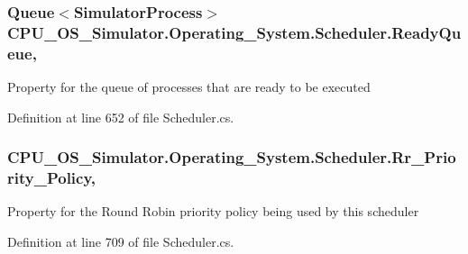 \subsubsection[{Ready\+Queue}]{\setlength{\rightskip}{0pt plus 5cm}Queue$<${\bf Simulator\+Process}$>$ C\+P\+U\+\_\+\+O\+S\+\_\+\+Simulator.\+Operating\+\_\+\+System.\+Scheduler.\+Ready\+Queue\hspace{0.3cm}{\ttfamily [get]}, {\ttfamily [set]}}\label{class_c_p_u___o_s___simulator_1_1_operating___system_1_1_scheduler_a7f0cc5668527496de0028013dae3be0c}


Property for the queue of processes that are ready to be executed 



Definition at line 652 of file Scheduler.\+cs.

\hypertarget{class_c_p_u___o_s___simulator_1_1_operating___system_1_1_scheduler_aadb6b79c667cfd6baef113c44fb98f9e}{}
\subsubsection[{Rr\+\_\+\+Priority\+\_\+\+Policy}]{ C\+P\+U\+\_\+\+O\+S\+\_\+\+Simulator.\+Operating\+\_\+\+System.\+Scheduler.\+Rr\+\_\+\+Priority\+\_\+\+Policy\hspace{0.3cm}{\ttfamily [get]}, {\ttfamily [set]}}\label{class_c_p_u___o_s___simulator_1_1_operating___system_1_1_scheduler_aadb6b79c667cfd6baef113c44fb98f9e}


Property for the Round Robin priority policy being used by this scheduler 



Definition at line 709 of file Scheduler.\+cs.

\hypertarget{class_c_p_u___o_s___simulator_1_1_operating___system_1_1_scheduler_ab21e8ffe8d0f06388cc2310d3dbb3b48}{}
